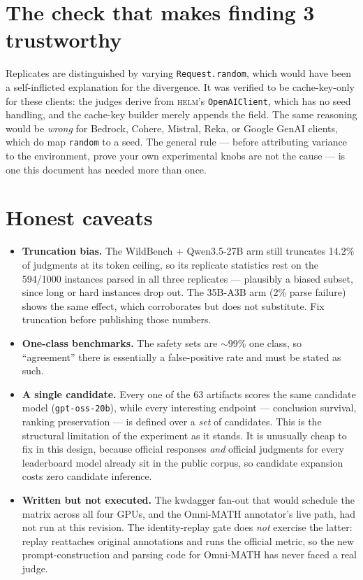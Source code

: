 \documentclass[11pt]{report}
\newcommand{\code}[1]{\texttt{#1}}
\begin{document}
\section{The check that makes finding 3 trustworthy}

Replicates are distinguished by varying \code{Request.random}, which would have been
a self-inflicted explanation for the divergence. It was verified to be cache-key-only
for these clients: the judges derive from \textsc{helm}'s \code{OpenAIClient}, which
has no seed handling, and the cache-key builder merely appends the field. The same
reasoning would be \emph{wrong} for Bedrock, Cohere, Mistral, Reka, or Google GenAI
clients, which do map \code{random} to a seed. The general rule --- before
attributing variance to the environment, prove your own experimental knobs are not
the cause --- is one this document has needed more than once.

\section{Honest caveats}

\begin{itemize}[nosep]
  \item \textbf{Truncation bias.} The WildBench + Qwen3.5-27B arm still truncates
        14.2\% of judgments at its token ceiling, so its replicate statistics rest on
        the 594/1000 instances parsed in all three replicates --- plausibly a biased
        subset, since long or hard instances drop out. The 35B-A3B arm (2\% parse
        failure) shows the same effect, which corroborates but does not substitute.
        Fix truncation before publishing those numbers.
  \item \textbf{One-class benchmarks.} The safety sets are $\sim$99\% one class, so
        ``agreement'' there is essentially a false-positive rate and must be stated
        as such.
  \item \textbf{A single candidate.} Every one of the 63 artifacts scores the same
        candidate model (\code{gpt-oss-20b}), while every interesting endpoint ---
        conclusion survival, ranking preservation --- is defined over a \emph{set} of
        candidates. This is the structural limitation of the experiment as it stands.
        It is unusually cheap to fix in this design, because official responses
        \emph{and} official judgments for every leaderboard model already sit in the
        public corpus, so candidate expansion costs zero candidate inference.
  \item \textbf{Written but not executed.} The kwdagger fan-out that would schedule
        the matrix across all four GPUs, and the Omni-MATH annotator's live path,
        had not run at this revision. The identity-replay gate does \emph{not}
        exercise the latter: replay reattaches original annotations and runs the
        official metric, so the new prompt-construction and parsing code for
        Omni-MATH has never faced a real judge.
\end{itemize}
\end{document}
